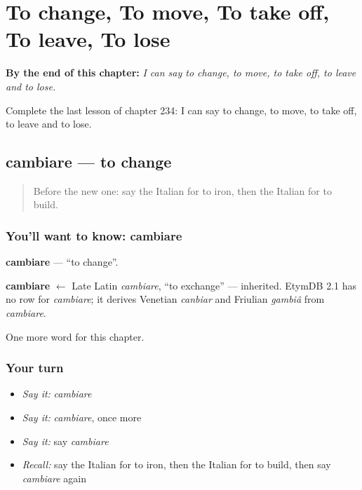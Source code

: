 
\chapter{To change, To move, To take off, To leave, To lose}
\label{ch:it-to-change-to-move-to-take-off-to-leave-to-lose}

\begin{chapteropening}
\textbf{By the end of this chapter:} \emph{I can say to change, to move, to take off, to leave and to lose.}

Complete the last lesson of chapter 234: I can say to change, to move, to take off, to leave and to lose.
\end{chapteropening}

\section[cambiare]{cambiare — to change}

\label{lesson:IT-C234-cambiare}



\begin{quote}
Before the new one: say the Italian for to iron, then the Italian for to build.
\end{quote}

\subsection*{You'll want to know: cambiare}
\textbf{cambiare} — \textquotedblleft{}to change\textquotedblright{}.

\begin{cousinweb}
\textbf{cambiare} $\leftarrow$ Late Latin \emph{cambiare}, \textquotedblleft{}to exchange\textquotedblright{} — inherited. EtymDB 2.1 has no row for \emph{cambiare}; it derives Venetian \emph{canbiar} and Friulian \emph{gambiâ} from \emph{cambiare}.
\end{cousinweb}

\begin{grammarlens}[title={What you've built}]
One more word for this chapter.
\end{grammarlens}

\subsection*{Your turn}
\begin{itemize}
\raggedright
  \item \emph{Say it:} \emph{cambiare}
  \item \emph{Say it:} \emph{cambiare}, once more
  \item \emph{Say it:} say \emph{cambiare}
  \item \emph{Recall:} say the Italian for to iron, then the Italian for to build, then say \emph{cambiare} again
\end{itemize}

